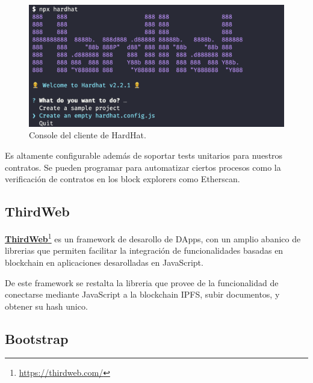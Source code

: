 \bigskip

\begin{figure}[H]
        \centering
        \includegraphics[width=1\textwidth]{img/capturas/hardhat.png}
        \caption{Console del cliente de HardHat.}
        \label{fig:configApi}
\end{figure}

\bigskip

Es altamente configurable además de soportar tests unitarios para nuestros contratos. Se pueden programar  para automatizar ciertos procesos como la verificación de contratos en los block explorers como Etherscan.

\newpage

\subsection{ThirdWeb}

\textcolor{blue}{\href{https://thirdweb.com/}{\textbf{ThirdWeb}}}\footnote{\url{https://thirdweb.com/}} es un framework de desarollo de DApps, con un amplio abanico de librerias que permiten facilitar la integración de funcionalidades basadas en blockchain en aplicaciones desarolladas en JavaScript. 

\bigskip

De este framework se restalta la libreria  que provee de la funcionalidad de conectarse mediante JavaScript a la blockchain IPFS, subir documentos, y obtener su hash unico. 

\bigskip



\subsection{Bootstrap}

